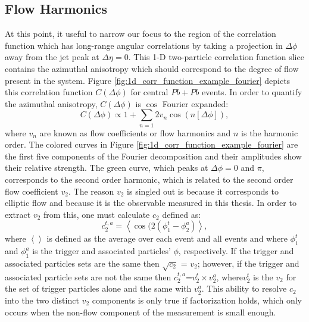 \subsection{Flow Harmonics}
At this point, it useful to narrow our focus to the region of the correlation function which has long-range angular correlations by taking a projection in $\Delta\phi$ away from the jet peak at $\Delta\eta = 0$. This 1-D two-particle correlation function slice contains the azimuthal anisotropy which should correspond to the degree of flow present in the system. Figure \ref{fig:1d_corr_function_example_fourier} depicts this correlation function $C(\Delta\phi)$ for central $Pb+Pb$ events. In order to quantify the azimuthal anisotropy, $C(\Delta\phi)$ is $\cos$ Fourier expanded:
\begin{equation}\label{eqn:dndphi}
  C(\Delta\phi) \propto 1 + \sum_{n=1}2 v_{n}\cos(n[\Delta\phi]),
\end{equation}
where $v_n$ are known as flow coefficients or flow harmonics and $n$ is the harmonic order. The colored curves in Figure \ref{fig:1d_corr_function_example_fourier} are the first five components of the Fourier decomposition and their amplitudes show their relative strength. The green curve, which peaks at $\Delta\phi = 0$ and $\pi$, corresponds to the second order harmonic, which is related to the second order flow coefficient $v_2$. The reason $v_2$ is singled out is because it corresponds to elliptic flow and because it is the observable measured in this thesis. In order to extract $v_2$ from this, one must calculate $c_2$ defined as:
\begin{equation}
  c_2^{t,a} = \left<\cos(2(\phi_1^t-\phi_2^a)\right>,
\end{equation}
where $\left<\right>$ is defined as the average over each event and all events and where $\phi_1^t$ and $\phi_1^a$ is the trigger and associated particles' $\phi$, respectively. If the trigger and associated particles sets are the same then $\sqrt{c_2}$ = $v_2$; however, if the trigger and associated particle sets are not the same then $c_2^{t,a} $=$v_2^{t}\times v_2^{a}$, where$v_2^{t}$ is the $v_2$ for the set of trigger particles alone and the same with $v_2^a$. This ability to resolve $c_2$ into the two distinct $v_2$ components is only true if factorization holds, which only occurs when the non-flow component of the measurement is small enough.
